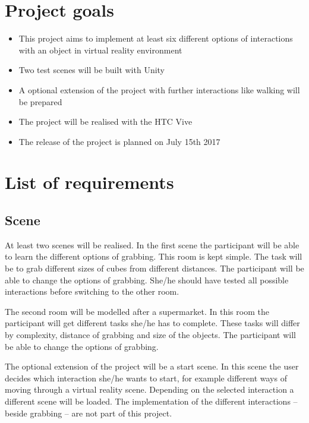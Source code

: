 \documentclass[a4paper, 12pt]{article}
\newcommand{\changefont}[3]{
\fontfamily{#1} \fontseries{#2} \fontshape{#3} \selectfont}
\begin{document}



    
\section{Project goals}

\begin{itemize}
\item This project aims to implement at least six different options of interactions with an object in virtual reality environment 
\item Two test scenes will be built with Unity
\item A optional extension of the project with further interactions like walking will be prepared
\item The project will be realised with the HTC Vive
\item The release of the project is planned on July 15th 2017
\end{itemize}

\section{List of requirements}
\subsection{Scene}
At least two scenes will be realised. In the first scene the participant will be able to learn the different options of grabbing. This room is kept simple. The task will be to grab different sizes of cubes from different distances. The participant will be able to change the options of grabbing. She/he should have tested all possible interactions before switching to the other room.

The second room will be modelled after a supermarket. In this room the participant will get different tasks she/he has to complete. These tasks will differ by complexity, distance of grabbing and size of the objects. The participant will be able to change the options of grabbing.

The optional extension of the project will be a start scene. In this scene the user decides which interaction she/he wants to start, for example different ways of moving through a virtual reality scene. Depending on the selected interaction a different scene will be loaded. The implementation of the different interactions -- beside grabbing -- are not part of this project. 
\end{document}
